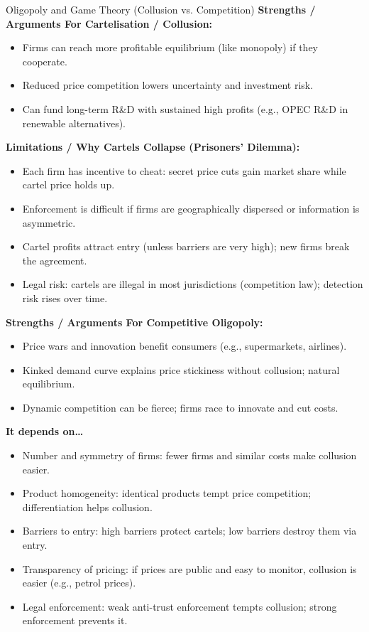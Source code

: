 \documentclass[11pt, a4paper, twoside]{book}
\begin{document}
\begin{evaluation}{Oligopoly and Game Theory (Collusion vs. Competition)}
\textbf{Strengths / Arguments For Cartelisation / Collusion:}
\begin{itemize}[leftmargin=*, nosep]
\item Firms can reach more profitable equilibrium (like monopoly) if they cooperate.
\item Reduced price competition lowers uncertainty and investment risk.
\item Can fund long-term R\&D with sustained high profits (e.g., OPEC R\&D in renewable alternatives).
\end{itemize}
\textbf{Limitations / Why Cartels Collapse (Prisoners' Dilemma):}
\begin{itemize}[leftmargin=*, nosep]
\item Each firm has incentive to cheat: secret price cuts gain market share while cartel price holds up.
\item Enforcement is difficult if firms are geographically dispersed or information is asymmetric.
\item Cartel profits attract entry (unless barriers are very high); new firms break the agreement.
\item Legal risk: cartels are illegal in most jurisdictions (competition law); detection risk rises over time.
\end{itemize}
\textbf{Strengths / Arguments For Competitive Oligopoly:}
\begin{itemize}[leftmargin=*, nosep]
\item Price wars and innovation benefit consumers (e.g., supermarkets, airlines).
\item Kinked demand curve explains price stickiness without collusion; natural equilibrium.
\item Dynamic competition can be fierce; firms race to innovate and cut costs.
\end{itemize}
\textbf{It depends on\ldots}
\begin{itemize}[leftmargin=*, nosep]
\item Number and symmetry of firms: fewer firms and similar costs make collusion easier.
\item Product homogeneity: identical products tempt price competition; differentiation helps collusion.
\item Barriers to entry: high barriers protect cartels; low barriers destroy them via entry.
\item Transparency of pricing: if prices are public and easy to monitor, collusion is easier (e.g., petrol prices).
\item Legal enforcement: weak anti-trust enforcement tempts collusion; strong enforcement prevents it.
\end{itemize}
\end{evaluation}
\end{document}
